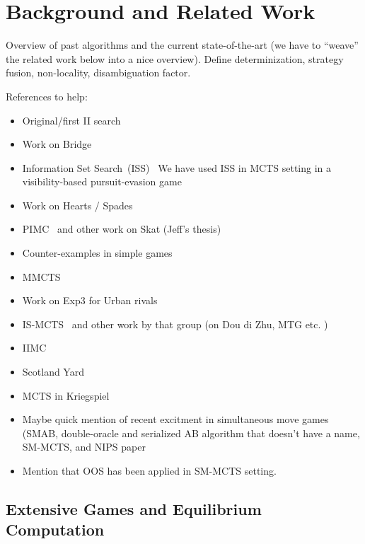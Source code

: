 \documentclass[letterpaper]{article}
\begin{document}
\section{Background and Related Work}

Overview of past algorithms and the current state-of-the-art (we have to ``weave'' the related work below into a nice overview).
Define determinization, strategy fusion, non-locality, disambiguation factor. 

References to help:
\begin{itemize}
\item Original/first II search~\cite{Frank98Finding}
\item Work on Bridge~\cite{Ginsberg01}
\item Information Set Search~(ISS)~\cite{Parker10iss,Parker06paranoia}
We have used ISS in MCTS setting in a visibility-based pursuit-evasion game~\cite{Lisy12peg}
\item Work on Hearts / Spades~\cite{Sturtevant08An}
\item PIMC~\cite{long2010understanding} and other work on Skat (Jeff's thesis)
\item Counter-examples in simple games~\cite{Shafiei09,Ponsen11Computing} 
\item MMCTS~\cite{Auger11Multiple}
\item Work on Exp3 for Urban rivals~\cite{Teytaud11Upper,StPierre12Online}
\item IS-MCTS~\cite{Cowling12ISMCTS} and other work by that group (on Dou di Zhu, MTG etc. \cite{Whitehouse11DDZ,Cowling12MTG})
\item IIMC~\cite{Furtak13Recursive}
\item Scotland Yard~\cite{Nijssen12SY}
\item MCTS in Kriegspiel~\cite{Ciancarini10Kriegspiel}
\item Maybe quick mention of recent excitment in simultaneous move games (SMAB, double-oracle and serialized AB algorithm that doesn't have a name, SM-MCTS, and NIPS paper
\item Mention that OOS has been applied in SM-MCTS setting.
\end{itemize}

\subsection{Extensive Games and Equilibrium Computation}
\end{document}
